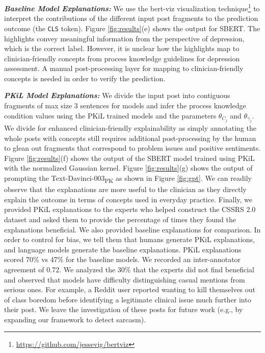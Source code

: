 \documentclass[letterpaper]{article} %
\begin{document}
\textit{\textbf{Baseline Model Explanations: }}
We use the bert-viz visualization technique\footnote{\url{https://github.com/jessevig/bertviz}} to interpret the contributions of the different input post fragments to the prediction outcome (the \texttt{CLS} token). Figure \ref{fig:results}(e) shows the output for SBERT. The highlights convey meaningful information from the perspective of depression, which is the correct label. However, it is unclear how the highlights map to clinician-friendly concepts from process knowledge guidelines for depression assessment. A manual post-processing layer for mapping to clinician-friendly concepts is needed in order to verify the prediction.

\textit{\textbf{PKiL Model Explanations: }}
We divide the input post into contiguous fragments of max size $3$ sentences for models and infer the process knowledge condition values using the PKiL trained models and the parameters $\theta_{C_j}$ and $\theta_{\gamma_j}$. We divide for enhanced clinician-friendly explainability as simply annotating the whole posts with concepts still requires additional post-processing by the human to glean out fragments that correspond to problem issues and positive sentiments. Figure \ref{fig:results}(f) shows the output of the SBERT model trained using PKiL with the normalized Gaussian kernel. Figure \ref{fig:results}(g) shows the output of prompting the Text-Davinci-003\textsubscript{PK} as shown in Figure \ref{fig:gpt}. We can readily observe that the explanations are more useful to the clinician as they directly explain the outcome in terms of concepts used in everyday practice. Finally, we provided PKiL explanations to the experts who helped construct the CSSRS 2.0 dataset and asked them to provide the percentage of times they found the explanations beneficial. We also provided baseline explanations for comparison. In order to control for bias, we tell them that humans generate PKiL explanations, and language models generate the baseline explanations. PKiL explanations scored 70\% vs 47\% for the baseline models. We recorded an inter-annotator agreement of 0.72. We analyzed the 30\% that the experts did not find beneficial and observed that models have difficulty distinguishing casual mentions from serious ones. For example, a Reddit user reported wanting to kill themselves out of class boredom before identifying a legitimate clinical issue much further into their post. We leave the investigation of these posts for future work (e.g., by expanding our framework to detect sarcasm).
\end{document}
